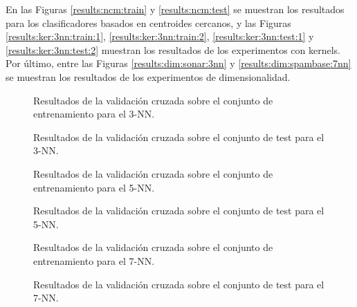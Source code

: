 En las Figuras \ref{results:ncm:train} y \ref{results:ncm:test} se muestran los resultados para los clasificadores basados en centroides cercanos, y las Figuras \ref{results:ker:3nn:train:1}, \ref{results:ker:3nn:train:2}, \ref{results:ker:3nn:test:1} y \ref{results:ker:3nn:test:2} muestran los resultados de los experimentos con kernels. Por último, entre las Figuras \ref{results:dim:sonar:3nn} y \ref{results:dim:spambase:7nn} se muestran los resultados de los experimentos de dimensionalidad.

\begin{figure}[h]
\resizebox{\textwidth}{!}{%
    
}
\caption{Resultados de la validación cruzada sobre el conjunto de entrenamiento para el 3-NN.} \label{results:normal:3nn:train}
\end{figure}

\begin{figure}[h]
\resizebox{\textwidth}{!}{%
    
}
\caption{Resultados de la validación cruzada sobre el conjunto de test para el 3-NN.} \label{results:normal:3nn:test}
\end{figure}

\begin{figure}[h]
\resizebox{\textwidth}{!}{%
    
}
\caption{Resultados de la validación cruzada sobre el conjunto de entrenamiento para el 5-NN.} \label{results:normal:5nn:train}
\end{figure}

\begin{figure}[h]
\resizebox{\textwidth}{!}{%
    
}
\caption{Resultados de la validación cruzada sobre el conjunto de test para el 5-NN.} \label{results:normal:5nn:test}
\end{figure}

\begin{figure}[h]
\resizebox{\textwidth}{!}{%
    
}
\caption{Resultados de la validación cruzada sobre el conjunto de entrenamiento para el 7-NN.} \label{results:normal:7nn:train}
\end{figure}

\begin{figure}[h]
\resizebox{\textwidth}{!}{%
    
}
\caption{Resultados de la validación cruzada sobre el conjunto de test para el 7-NN.} \label{results:normal:7nn:test}
\end{figure}

